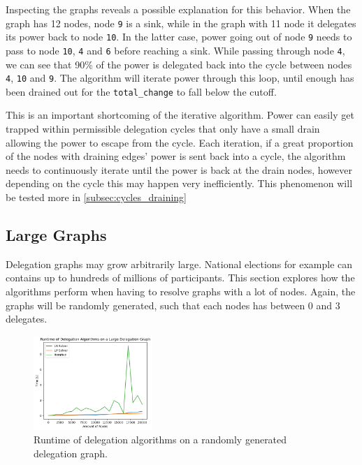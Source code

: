 Inspecting the graphs reveals a possible explanation for this behavior. When the graph has 12 nodes, node \texttt{9} is a sink, while in the graph with 11 node it delegates its power back to node \texttt{10}. In the latter case, power going out of node \texttt{9} needs to pass to node \texttt{10}, \texttt{4} and \texttt{6} before reaching a sink. While passing through node \texttt{4}, we can see that 90\% of the power is delegated back into the cycle between nodes \texttt{4}, \texttt{10} and \texttt{9}. The algorithm will iterate power through this loop, until enough has been drained out for the \texttt{total\_change} to fall below the cutoff. 

This is an important shortcoming of the iterative algorithm. Power can easily get trapped within permissible delegation cycles that only have a small drain allowing the power to escape from the cycle. Each iteration, if a great proportion of the nodes with draining edges' power is sent back into a cycle, the algorithm needs to continuously iterate until the power is back at the drain nodes, however depending on the cycle this may happen very inefficiently. This phenomenon will be tested more in \cref{subsec:cycles_draining}

\subsection{Large Graphs}

Delegation graphs may grow arbitrarily large. National elections for example can contains up to hundreds of millions of participants. This section explores how the algorithms perform when having to resolve graphs with a lot of nodes. Again, the graphs will be randomly generated, such that each nodes has between 0 and 3 delegates. 

\begin{figure}[h]
    \centering
    \includegraphics[width=0.4\textwidth]{0-20000_random}
    \caption{Runtime of delegation algorithms on a randomly generated delegation graph.}
    \label{fig:random-large}
\end{figure}

